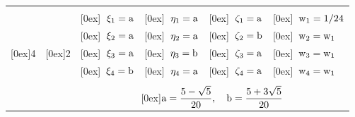 \begin{table}
\begin{center}
\begin{tabular}{|c|c|l|l|l|l|}
\hline

                                                               &                                         &                                                             &                                                               &                                                               &                                                           \\
                                                               &                                         & \raisebox{0.3cm}[0ex]{$\;\;\rm \xi_1 = a                   $} & \raisebox{0.3cm}[0ex]{$\;\;\rm \eta_1 = a         $}             & \raisebox{0.3cm}[0ex]{$\;\;\rm  \zeta_1 = a         $}            & \raisebox{0.3cm}[0ex]{$\;\;\rm w_1 = 1/24           $}    \\
                                                               &                                         & \raisebox{0.3cm}[0ex]{$\;\;\rm \xi_2 = a                   $} & \raisebox{0.3cm}[0ex]{$\;\;\rm \eta_2 = a         $}             & \raisebox{0.3cm}[0ex]{$\;\;\rm  \zeta_2 = b         $}            & \raisebox{0.3cm}[0ex]{$\;\;\rm w_2 = w_1            $}    \\
\raisebox{0.3cm}[0ex]{4}                                       & \raisebox{0.3cm}[0ex]{2}                & \raisebox{0.3cm}[0ex]{$\;\;\rm \xi_3 = a                   $} & \raisebox{0.3cm}[0ex]{$\;\;\rm \eta_3 = b         $}             & \raisebox{0.3cm}[0ex]{$\;\;\rm  \zeta_3 = a         $}            & \raisebox{0.3cm}[0ex]{$\;\;\rm w_3 = w_1            $}    \\
                                                               &                                         & \raisebox{0.3cm}[0ex]{$\;\;\rm \xi_4 = b                   $} & \raisebox{0.3cm}[0ex]{$\;\;\rm \eta_4 = a         $}             & \raisebox{0.3cm}[0ex]{$\;\;\rm  \zeta_4 = a         $}            & \raisebox{0.3cm}[0ex]{$\;\;\rm w_4 = w_1            $}    \\
\cline{3-6} 
                                                               &                                         & \multicolumn{4}{c|}{}                                                                                                                                                               \\
                                                               &                                         & \multicolumn{4}{c|}{\raisebox{0.3cm}[0ex]{$\rm a = \dfrac{5-\sqrt{5}}{20}, \quad b = \dfrac{5+3\sqrt{5}}{20}$}}                                                                                                                                                               \\
\hline


\end{tabular}
\end{center}
\end{table}

